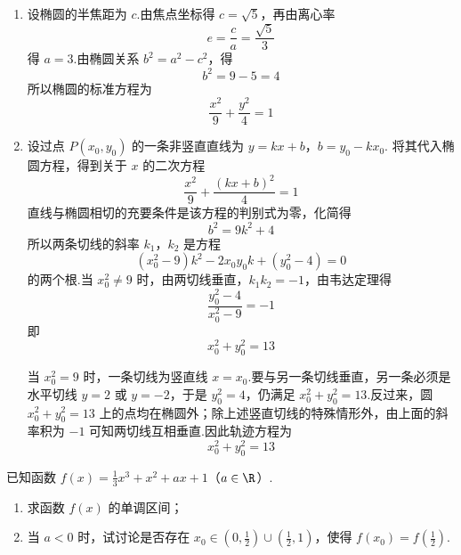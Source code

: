 \begin{solution}
\begin{enumerate}
\item 设椭圆的半焦距为 \(c\).由焦点坐标得 \(c=\sqrt{5}\)，再由离心率
\[
e=\frac{c}{a}=\frac{\sqrt{5}}{3}
\]
得 \(a=3\).由椭圆关系 \(b^2=a^2-c^2\)，得
\[
b^2=9-5=4
\]
所以椭圆的标准方程为
\[
\frac{x^2}{9}+\frac{y^2}{4}=1
\]

\item 设过点 \(P(x_0,y_0)\) 的一条非竖直直线为
\(y=kx+b\)，\(b=y_0-kx_0\).
将其代入椭圆方程，得到关于 \(x\) 的二次方程
\[
\frac{x^2}{9}+\frac{(kx+b)^2}{4}=1
\]
直线与椭圆相切的充要条件是该方程的判别式为零，化简得
\[
b^2=9k^2+4
\]
所以两条切线的斜率 \(k_1\)，\(k_2\) 是方程
\[
(x_0^2-9)k^2-2x_0y_0k+(y_0^2-4)=0
\]
的两个根.当 \(x_0^2\ne9\) 时，由两切线垂直，\(k_1k_2=-1\)，由韦达定理得
\[
\frac{y_0^2-4}{x_0^2-9}=-1
\]
即
\[
x_0^2+y_0^2=13
\]

当 \(x_0^2=9\) 时，一条切线为竖直线 \(x=x_0\).要与另一条切线垂直，另一条必须是水平切线 \(y=2\) 或 \(y=-2\)，于是 \(y_0^2=4\)，仍满足 \(x_0^2+y_0^2=13\).反过来，圆 \(x_0^2+y_0^2=13\) 上的点均在椭圆外；除上述竖直切线的特殊情形外，由上面的斜率积为 \(-1\) 可知两切线互相垂直.因此轨迹方程为
\[
x_0^2+y_0^2=13
\]
\end{enumerate}
\end{solution}

\begin{problem}
已知函数 \(f(x) = \frac{1}{3}x^3 + x^2 + ax + 1\)（\(a \in \R\)）.

\begin{enumerate}
\item 求函数 \(f(x)\) 的单调区间；
\item 当 \(a < 0\) 时，试讨论是否存在 \(x_0 \in \left(0, \frac{1}{2}\right) \cup \left(\frac{1}{2}, 1\right)\)，使得 \(f(x_0) = f\left(\frac{1}{2}\right)\).
\end{enumerate}
\end{problem}

